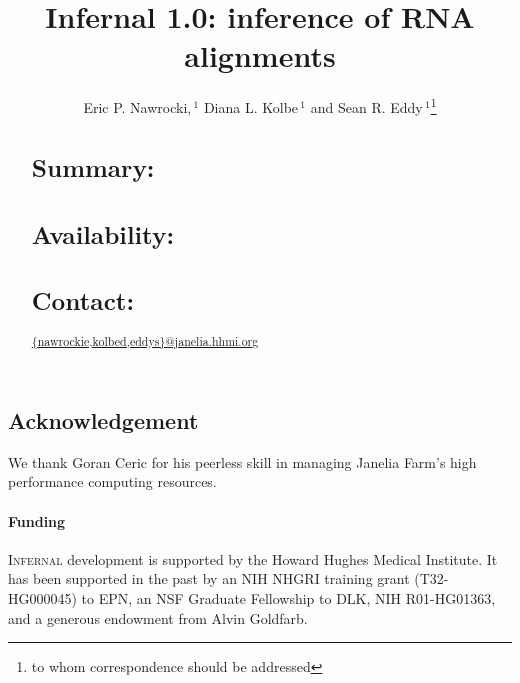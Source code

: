 \documentclass{bioinfo}
\begin{document}

\begin{application}

\title[Infernal 1.0]{Infernal 1.0: inference of RNA alignments}
\author[E. Nawrocki, D. Kolbe and S. Eddy]{Eric P. Nawrocki,\,$^1$ Diana L. Kolbe\,$^1$ and Sean R. Eddy\,$^1$\footnote{to whom correspondence should be addressed}}
\address{$^{1}$HHMI Janelia Farm Research Campus, Ashburn VA 20147, USA\\}



\maketitle

\begin{abstract}
\section{Summary:}

\section{Availability:}

\section{Contact:} \url{{nawrockie,kolbed,eddys}@janelia.hhmi.org}
\end{abstract}






\section*{Acknowledgement}

We thank Goran Ceric for his peerless skill in managing Janelia Farm's
high performance computing resources.

\paragraph*{Funding\textcolon} 
\textsc{Infernal} development is supported by the Howard Hughes
Medical Institute. It has been supported in the past by an NIH NHGRI
training grant (T32-HG000045) to EPN, an NSF Graduate Fellowship to
DLK, NIH R01-HG01363, and a generous endowment from Alvin Goldfarb.



\end{application}
\end{document}
